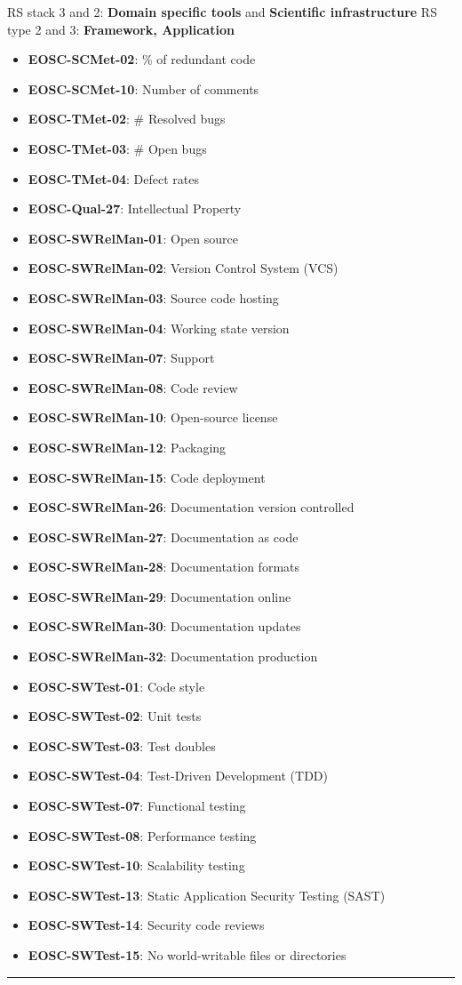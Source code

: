 RS stack 3 and 2: \textbf{Domain specific tools} and \textbf{Scientific infrastructure} \newline
RS type 2 and 3: \textbf{Framework, Application}

\begin{itemize}
    \item \textbf{EOSC-SCMet-02}: \% of redundant code
    \item \textbf{EOSC-SCMet-10}: Number of comments
    \item \textbf{EOSC-TMet-02}: \# Resolved bugs
    \item \textbf{EOSC-TMet-03}: \# Open bugs
    \item \textbf{EOSC-TMet-04}: Defect rates
    \item \textbf{EOSC-Qual-27}: Intellectual Property
    \item \textbf{EOSC-SWRelMan-01}: Open source
    \item \textbf{EOSC-SWRelMan-02}: Version Control System (VCS)
    \item \textbf{EOSC-SWRelMan-03}: Source code hosting
    \item \textbf{EOSC-SWRelMan-04}: Working state version
    \item \textbf{EOSC-SWRelMan-07}: Support
    \item \textbf{EOSC-SWRelMan-08}: Code review
    \item \textbf{EOSC-SWRelMan-10}: Open-source license
    \item \textbf{EOSC-SWRelMan-12}: Packaging
    \item \textbf{EOSC-SWRelMan-15}: Code deployment
    \item \textbf{EOSC-SWRelMan-26}: Documentation version controlled
    \item \textbf{EOSC-SWRelMan-27}: Documentation as code
    \item \textbf{EOSC-SWRelMan-28}: Documentation formats
    \item \textbf{EOSC-SWRelMan-29}: Documentation online
    \item \textbf{EOSC-SWRelMan-30}: Documentation updates
    \item \textbf{EOSC-SWRelMan-32}: Documentation production
    \item \textbf{EOSC-SWTest-01}: Code style
    \item \textbf{EOSC-SWTest-02}: Unit tests
    \item \textbf{EOSC-SWTest-03}: Test doubles
    \item \textbf{EOSC-SWTest-04}: Test-Driven Development (TDD)
    \item \textbf{EOSC-SWTest-07}: Functional testing
    \item \textbf{EOSC-SWTest-08}: Performance testing
    \item \textbf{EOSC-SWTest-10}: Scalability testing
    \item \textbf{EOSC-SWTest-13}: Static Application Security Testing (SAST)
    \item \textbf{EOSC-SWTest-14}: Security code reviews
    \item \textbf{EOSC-SWTest-15}: No world-writable files or directories
\end{itemize}
\hrule

